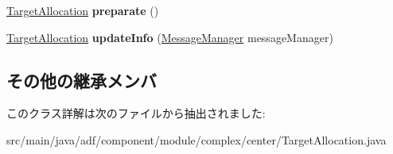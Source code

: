 \begin{DoxyCompactItemize}
\item 
\hypertarget{classadf_1_1component_1_1module_1_1complex_1_1center_1_1TargetAllocation_aee502199de740680e044fa0f52f00b17}{}\label{classadf_1_1component_1_1module_1_1complex_1_1center_1_1TargetAllocation_aee502199de740680e044fa0f52f00b17} 
\hyperlink{classadf_1_1component_1_1module_1_1complex_1_1center_1_1TargetAllocation}{Target\+Allocation} {\bfseries preparate} ()
\item 
\hypertarget{classadf_1_1component_1_1module_1_1complex_1_1center_1_1TargetAllocation_a06cb13395e25a124c011b39beeebdee0}{}\label{classadf_1_1component_1_1module_1_1complex_1_1center_1_1TargetAllocation_a06cb13395e25a124c011b39beeebdee0} 
\hyperlink{classadf_1_1component_1_1module_1_1complex_1_1center_1_1TargetAllocation}{Target\+Allocation} {\bfseries update\+Info} (\hyperlink{classadf_1_1agent_1_1communication_1_1MessageManager}{Message\+Manager} message\+Manager)
\end{DoxyCompactItemize}
\subsection*{その他の継承メンバ}


このクラス詳解は次のファイルから抽出されました\+:\begin{DoxyCompactItemize}
\item 
src/main/java/adf/component/module/complex/center/Target\+Allocation.\+java\end{DoxyCompactItemize}
